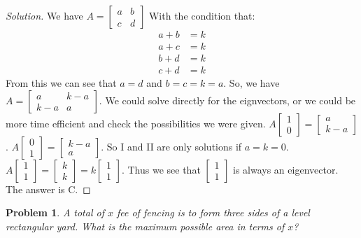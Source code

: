 \documentclass[crop=false,class=book]{standalone}
\theoremstyle{mystyle}
\newtheorem{problem}{Problem}[section]
\begin{document}
\begin{proof}[Solution]
We have $A = \begin{bmatrix} a & b \\ c & d\end{bmatrix}$ With the condition that:
\begin{align*}
    a+b&=k\\
    a+c&=k\\
    b+d&=k\\
    c+d&=k
\end{align*}
From this we can see that $a = d$ and $b=c = k=a$.
So, we have $A = \begin{bmatrix} a & k-a \\ k-a & a\end{bmatrix}$. We could solve directly for the eignvectors, or we could be more time efficient and check the possibilities we were given. $A\begin{bmatrix}1 \\ 0 \end{bmatrix} = \begin{bmatrix} a \\ k-a \end{bmatrix}$. $A\begin{bmatrix} 0 \\ 1 \end{bmatrix} = \begin{bmatrix} k-a \\ a \end{bmatrix}$. So I and II are only solutions if $a = k = 0$. $A\begin{bmatrix} 1 \\ 1 \end{bmatrix} = \begin{bmatrix} k \\ k\end{bmatrix} = k \begin{bmatrix} 1 \\ 1 \end{bmatrix}$. Thus we see that $\begin{bmatrix} 1 \\ 1 \end{bmatrix}$ is always an eigenvector. The answer is C.
\end{proof}
\begin{problem}
A total of $x$ fee of fencing is to form three sides of a level rectangular yard. What is the maximum possible area in terms of $x$?
\end{problem}
\end{document}
